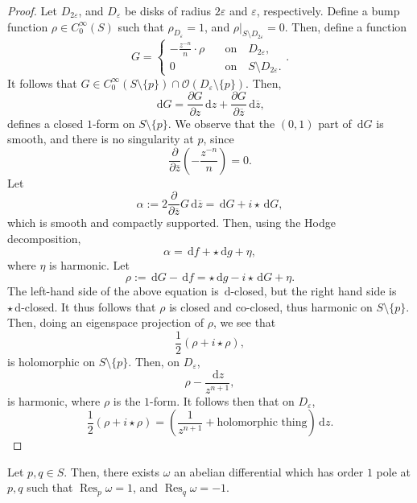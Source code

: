 \documentclass[a4paper]{report}
\theoremstyle{definition}
\theoremstyle{remark}
\theoremstyle{proposition}
\theoremstyle{conjecture}
\theoremstyle{lemma}
\theoremstyle{corollary}
\theoremstyle{exercise}
\theoremstyle{example}
\newcommand{\mcal}{\mathcal}
\newcommand{\diff}{\,\mathrm{d}}
\newcommand{\on}{\operatorname}
\begin{document}
\begin{proof}
    Let $D_{2\varepsilon}$, and $D_\varepsilon$ be disks of radius
    $2\varepsilon$ and $\varepsilon$, respectively. 
    Define a bump function $\rho \in C^\infty_0(S)$ such that 
    $\rho_{D_\varepsilon} = 1$, and $\rho\vert_{S\setminus D_{2\varepsilon}}=0$.
    Then, define a function
    $$G = \begin{cases}
        -\frac{z^{-n}}{n}\cdot \rho \quad &\text{on} \quad D_{2\varepsilon},\\
        0 \quad &\text{on} \quad S\setminus D_{2\varepsilon}.
    \end{cases}.$$
    It follows that $G \in C_0^\infty(S\setminus \lbrace p\rbrace)\cap \mcal{O}(D_\varepsilon\setminus \lbrace p \rbrace).$
    Then, $$\diff G = \frac{\partial G}{\partial z} \diff z + \frac{\partial G}{\partial \overline{z}}\diff \overline{z},$$
    defines a closed $1$-form on $S\setminus\lbrace p \rbrace$.
    We observe that the $(0,1)$ part of $\diff G$ is smooth,
    and there is no singularity at $p$, since 
    $$\frac{\partial}{\partial \overline{z}} \left(-\frac{z^{-n}}{n}\right) = 0.$$
    Let $$\alpha := 2\frac{\partial}{\partial \overline{z}}G\diff \overline{z} = \diff G + i\star \diff G,$$
    which is smooth and compactly supported. Then, using the Hodge decomposition,
    $$\alpha = \diff f + \star\diff g + \eta,$$
    where $\eta$ is harmonic.
    Let $$\rho := \diff G - \diff f= \star\diff g - i\star \diff G + \eta.$$
    The left-hand side of the above equation is $\diff$-closed, but the right
    hand side is $\star\diff$-closed. It thus follows that $\rho$ 
    is closed and co-closed, thus harmonic on $S\setminus \lbrace p \rbrace$.
    Then, doing an eigenspace projection of $\rho$, we see that 
    $$\frac{1}{2}\left( \rho + i\star\rho\right),$$
    is holomorphic on $S\setminus \lbrace p \rbrace$. 
    Then, on $D_\varepsilon$, $$\rho - \frac{\diff z}{z^{n+1}},$$
    is harmonic, where $\rho$ is the $1$-form.
    It follows then that on $D_\varepsilon$,
    $$\frac{1}{2}(\rho + i\star\rho) = \left(\frac{1}{z^{n+1}} + \text{holomorphic thing}\right)\diff z.$$

\end{proof}

\begin{theorem}
Let $p,q\in S$. Then, there exists $\omega$ an abelian differential 
which has order $1$ pole at $p,q$ such that $\on{Res}_p\omega=1$,
and $\on{Res}_q\omega = -1$.
\end{theorem}
\end{document}
